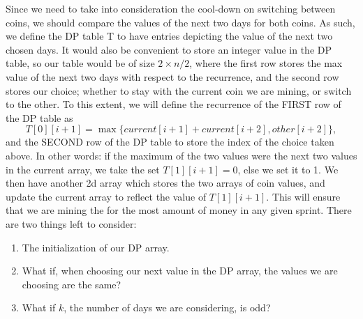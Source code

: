 \begin{solution}

    Since we need to take into consideration the cool-down on switching between coins, we should compare the values of the next two days for both coins. As such, we define the DP table T to have entries depicting the value of the next two chosen days. It would also be convenient to store an integer value in the DP table, so our table would be of size $2 \times n/2$, where the first row stores the max value of the next two days with respect to the recurrence, and the second row stores our choice; whether to stay with the current coin we are mining, or switch to the other. To this extent, we will define the recurrence of the FIRST row of the DP table as 
    \[T[0][i+1] = \max\{current[i+1] + current[i+2], other[i+2]\},\]
    and the SECOND row of the DP table to store the index of the choice taken above. In other words: if the maximum of the two values were the next two values in the current array, we take the set $T[1][i+1] = 0$, else we set it to 1. We then have another 2d array which stores the two arrays of coin values, and update the current array to reflect the value of $T[1][i+1]$. This will ensure that we are mining the for the most amount of money in any given sprint. There are two things left to consider: 
    \begin{enumerate}
        \item The initialization of our DP array.
        \item What if, when choosing our next value in the DP array, the values we are choosing are the same?
        \item What if $k$, the number of days we are considering, is odd?
    \end{enumerate}

\end{solution}
